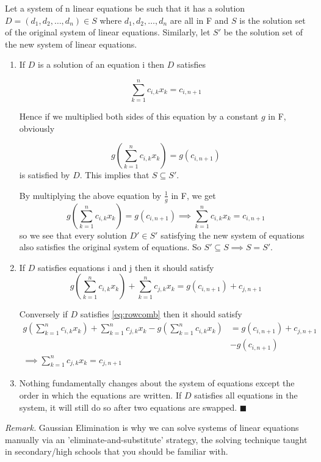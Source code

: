 \documentclass[oneside]{book}
\begin{document}
	\begin{pr}
		Let a system of n linear equations be such that it has a solution $D=(d_1,d_2,\ldots,d_n) \in S$ where $d_1,d_2,\ldots,d_n$ are all in F and $S$ is the solution set of the original system of linear equations. Similarly, let $S'$ be the solution set of the new system of linear equations.
	\begin{enumerate}
		\item If $D$ is a solution of an equation i then $D$ satisfies
		
		\begin{equation*}
			\sum_{k=1}^{n}{c_{i,k}x_k}=c_{i,n+1}
		\end{equation*}
		
		Hence if we multiplied both sides of this equation by a constant $g$ in F, obviously
		
		\begin{equation*}
			g(\sum_{k=1}^{n}{c_{i,k}x_k})=g(c_{i,n+1})
		\end{equation*}
		is satisfied by $D$. This implies that $S \subseteq S'$.
		
		By multiplying the above equation by $\frac{1}{g}$ in F, we get 			\begin{equation*}
			g(\sum_{k=1}^{n}{c_{i,k}x_k})=g(c_{i,n+1})
			\implies 
			\sum_{k=1}^{n}{c_{i,k}x_k}=c_{i,n+1}
		\end{equation*}
		so we see that every solution $D' \in S'$ satisfying the new system of equations also satisfies the original system of equations. So $S' \subseteq S \implies S=S'$.
	\item If $D$ satisfies equations i and j then it should satisfy
	\begin{equation}
		\label{eq:rowcomb}
		g(\sum_{k=1}^{n}{c_{i,k}x_k})+\sum_{k=1}^{n}{c_{j,k}x_k}=g(c_{i,n+1})+c_{j,n+1}
	\end{equation}

	Conversely if $D$ satisfies \ref{eq:rowcomb} then it should satisfy	
	\begin{equation*}
		\begin{split}
			g(\sum_{k=1}^{n}{c_{i,k}x_k})+\sum_{k=1}^{n}{c_{j,k}x_k}		-g(\sum_{k=1}^{n}{c_{i,k}x_k})&=g(c_{i,n+1})+c_{j,n+1} \\
			&-g(c_{i,n+1}) \\
			\implies \sum_{k=1}^{n}{c_{j,k}x_k}=c_{j,n+1} &
		\end{split}
	\end{equation*}
	
	\item Nothing fundamentally changes about the system of equations except the order in which the equations are written. If $D$ satisfies all equations in the system, it will still do so after two equations are swapped. $\blacksquare$
	\end{enumerate}
	\end{pr}
	\textit{Remark.} Gaussian Elimination is why we can solve systems of linear equations manually via an 'eliminate-and-substitute' strategy, the solving technique taught in secondary/high schools that you should be familiar with.
	
\end{document}
